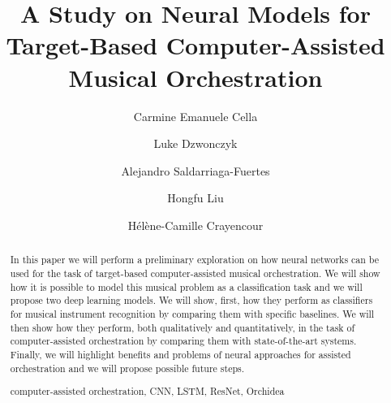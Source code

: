 \documentclass[runningheads,a4paper]{llncs}
\newcommand{\keywords}[1]{\par\addvspace\baselineskip
\noindent\keywordname\enspace\ignorespaces#1}
\begin{document}
\mainmatter  %

\title{A Study on Neural Models for Target-Based Computer-Assisted Musical Orchestration}


%
%
\author{Carmine Emanuele Cella\and Luke Dzwonczyk\and Alejandro Saldarriaga-Fuertes\and Hongfu Liu\and H\'el\`ene-Camille Crayencour}
%



%
%

\maketitle

\begin{abstract}
In this paper we will perform a preliminary exploration on how neural networks can be used for the task of target-based computer-assisted musical orchestration. We will show how it is possible to model this  musical problem as a classification task and we will propose two deep learning models. We will show, first, how they perform as classifiers for musical instrument recognition by comparing them with specific baselines. We will then show how they perform, both qualitatively and quantitatively, in the task of computer-assisted orchestration by comparing them with state-of-the-art systems. Finally, we will highlight benefits and problems of neural approaches for assisted orchestration and we will propose possible future steps.

\keywords{computer-assisted orchestration, CNN, LSTM, ResNet, Orchidea}

\end{abstract}
\end{document}
